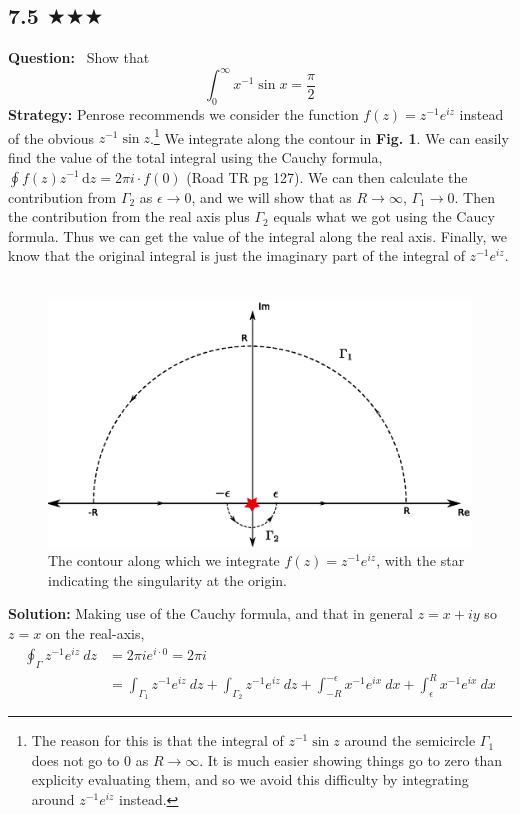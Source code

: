 \subsection{7.5 $\bigstar\bigstar\bigstar$}
\textbf{Question:} \ Show that
$$\int^{\infty}_{0}x^{-1}\sin x=\frac{\pi}{2}$$
\textbf{Strategy:} Penrose recommends we consider the function $f(z)=z^{-1} e^{iz}$ instead of the obvious $z^{-1} \sin z$.\footnote{The reason for this is that the integral of $z^{-1} \sin z$ around the semicircle $\Gamma_1$ does not go to 0 as $R\to\infty$. It is much easier showing things go to zero than explicity evaluating them, and so we avoid this difficulty by integrating around $z^{-1} e^{iz}$ instead.}   We integrate along the contour in \textbf{Fig. 1}. We can easily find the value of the total integral using the Cauchy formula, $\oint f(z)z^{-1}\, \text{d}z=2\pi i\cdot f(0)$ (Road TR pg 127). We can then calculate the contribution from $\Gamma_2$ as $\epsilon\to 0$, and we will show that as $R\to \infty$, $\Gamma_1\to 0$. Then the contribution from the real axis plus $\Gamma_2$ equals what we got using the Caucy formula. Thus we can get the value of the integral along the real axis. Finally, we know that the original integral is just the imaginary part of the integral of $z^{-1} e^{iz}$.\\ \\
\begin{figure}\label{e}
\includegraphics[scale=0.8]{chapters/images/7.5.eps}
\caption{The contour along which we integrate $f(z)=z^{-1} e^{iz}$, with the star indicating the singularity at the origin.  }
\end{figure}  
\textbf{Solution:} Making use of the Cauchy formula, and that in general $z=x+iy$ so $z=x$ on the real-axis,
\begin{align*}
\oint_\Gamma z^{-1}e^{iz} \ dz &= 2\pi i e^{i\cdot 0}=2\pi i\\
&=\int_{\Gamma_1} z^{-1}e^{iz}\ dz+\int_{\Gamma_2} z^{-1}e^{iz}\ dz+\int_{-R}^{-\epsilon} x^{-1}e^{ix}\ dx+\int^{R}_{\epsilon} x^{-1}e^{ix}\ dx
\end{align*}
